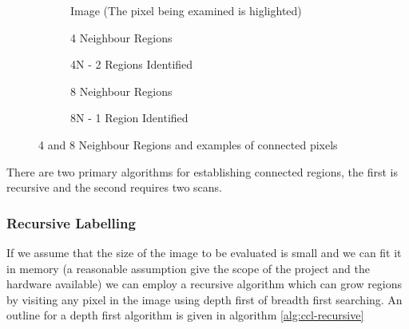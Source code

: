 \begin{figure}[h!]
    \centering
    \begin{subfigure}[b]{.6\linewidth}
        \centering
        
        \caption{Image (The pixel being examined is higlighted)}
    \end{subfigure}

    \vspace*{0.5in}
    
    \begin{subfigure}[b]{.4\linewidth}
        \centering
        
        \caption{4 Neighbour Regions}
        \label{fig:4-neighbour-regions}
    \end{subfigure}
    \begin{subfigure}[b]{.4\linewidth}
        \centering
        
        \caption{4N - 2 Regions Identified}
        \label{fig:4-neighbour-regions}
    \end{subfigure}

    \vspace*{0.5in}

    \begin{subfigure}[b]{.4\linewidth}
        \centering
        
        \label{fig:8-neighbour-regions}
        \caption{8 Neighbour Regions}
    \end{subfigure}
    \begin{subfigure}[b]{.4\linewidth}
        \centering
        
        \label{fig:8-neighbour-connected}
        \caption{8N - 1 Region Identified}
    \end{subfigure}

    \caption{4 and 8 Neighbour Regions and examples of connected pixels}
    \label{fig:pixel-neighbours}
\end{figure}

There are two primary algorithms for establishing connected regions, the first is recursive and the second requires two scans.

\subsubsection{Recursive Labelling}

If we assume that the size of the image to be evaluated is small and we can fit it in memory (a reasonable assumption give the scope of the project and the hardware available) we can employ a recursive algorithm which can grow regions by visiting any pixel in the image using depth first of breadth first searching. An outline for a depth first algorithm is given in algorithm \cref{alg:ccl-recursive}

